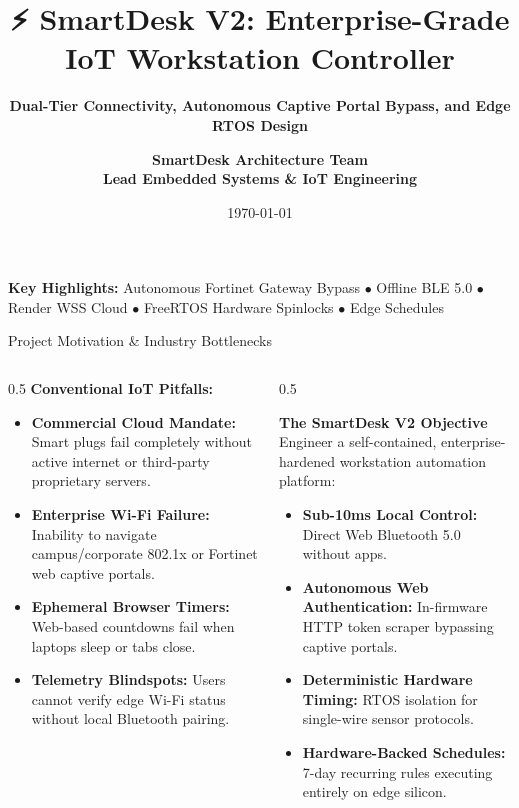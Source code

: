 \documentclass[aspectratio=169, 10pt]{beamer}
\title[SmartDesk V2]{\textbf{\Large ⚡ SmartDesk V2: Enterprise-Grade IoT Workstation Controller}}
\subtitle{\textbf{Dual-Tier Connectivity, Autonomous Captive Portal Bypass, and Edge RTOS Design}}
\author[\textbf{SmartDesk Architecture Team}]{\large \textbf{SmartDesk Architecture Team} \\ \vspace{0.2cm}\footnotesize \textbf{Lead Embedded Systems \& IoT Engineering}}
\institute[IoT Systems Engineering]{Department of Computer Science \& Embedded Systems Engineering}
\date{\today}
\begin{document}
\begin{frame}[plain]
    \titlepage
    \vspace{-0.6cm}
    \begin{center}
        \footnotesize
        \color{gray}
        \textbf{Key Highlights:} Autonomous Fortinet Gateway Bypass $\bullet$ Offline BLE 5.0 $\bullet$ Render WSS Cloud $\bullet$ FreeRTOS Hardware Spinlocks $\bullet$ Edge Schedules
    \end{center}
\end{frame}

\begin{frame}{Project Motivation \& Industry Bottlenecks}
    \begin{columns}[T]
        \begin{column}{0.5\textwidth}
            \textbf{Conventional IoT Pitfalls:}
            \begin{itemize}
                \item \textbf{Commercial Cloud Mandate:} Smart plugs fail completely without active internet or third-party proprietary servers.
                \item \textbf{Enterprise Wi-Fi Failure:} Inability to navigate campus/corporate 802.1x or Fortinet web captive portals.
                \item \textbf{Ephemeral Browser Timers:} Web-based countdowns fail when laptops sleep or tabs close.
                \item \textbf{Telemetry Blindspots:} Users cannot verify edge Wi-Fi status without local Bluetooth pairing.
            \end{itemize}
        \end{column}
        
        \begin{column}{0.5\textwidth}
            \begin{block}{\textbf{The SmartDesk V2 Objective}}
                Engineer a self-contained, enterprise-hardened workstation automation platform:
                \begin{itemize}
                    \item \textbf{Sub-10ms Local Control:} Direct Web Bluetooth 5.0 without apps.
                    \item \textbf{Autonomous Web Authentication:} In-firmware HTTP token scraper bypassing captive portals.
                    \item \textbf{Deterministic Hardware Timing:} RTOS isolation for single-wire sensor protocols.
                    \item \textbf{Hardware-Backed Schedules:} 7-day recurring rules executing entirely on edge silicon.
                \end{itemize}
            \end{block}
        \end{column}
    \end{columns}
\end{frame}
\end{document}
